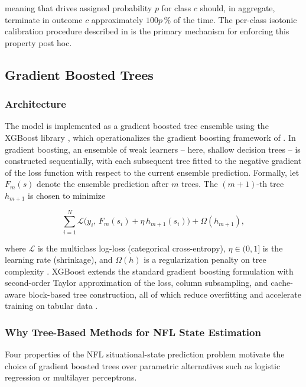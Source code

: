 meaning that drives assigned probability $p$ for class $c$ should, in
aggregate, terminate in outcome $c$ approximately $100p$\,\% of the time. The
per-class isotonic calibration procedure described in 
is the primary mechanism for enforcing this property post hoc.

\subsection{Gradient Boosted Trees}

\subsubsection{Architecture}

The \xscore{} model is implemented as a gradient boosted tree ensemble using
the XGBoost library \parencite{chen2016xgboost}, which operationalizes the
gradient boosting framework of \textcite{friedman2001gradientboosting}. In
gradient boosting, an ensemble of weak learners -- here, shallow decision
trees -- is constructed sequentially, with each subsequent tree fitted to the
negative gradient of the loss function with respect to the current ensemble
prediction. Formally, let $F_m(s)$ denote the ensemble prediction after $m$
trees. The $(m+1)$-th tree $h_{m+1}$ is chosen to minimize

\begin{equation}
  \sum_{i=1}^{N} \mathcal{L}\!\bigl(y_i,\, F_m(s_i) + \eta\, h_{m+1}(s_i)\bigr)
    + \Omega(h_{m+1}),
\end{equation}

where $\mathcal{L}$ is the multiclass log-loss (categorical cross-entropy),
$\eta \in (0,1]$ is the learning rate (shrinkage), and $\Omega(h)$ is a
regularization penalty on tree complexity \parencite{chen2016xgboost}. XGBoost extends the standard
gradient boosting formulation with second-order Taylor approximation of the
loss, column subsampling, and cache-aware block-based tree construction, all
of which reduce overfitting and accelerate training on tabular data
\parencite{chen2016xgboost}.

\subsubsection{Why Tree-Based Methods for NFL State Estimation}

Four properties of the NFL situational-state prediction problem motivate the
choice of gradient boosted trees over parametric alternatives such as logistic
regression or multilayer perceptrons.

